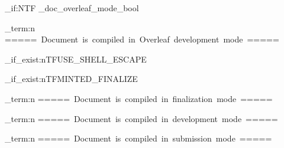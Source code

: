 \ExplSyntaxOn
\bool_if:NTF \g_doc_overleaf_mode_bool
{
    \iow_term:n {=====~Document~is~compiled~in~Overleaf~development~mode~=====}
    \usepackage{minted}
}
{
    \file_if_exist:nTF{USE_SHELL_ESCAPE}
    {
        \file_if_exist:nTF{MINTED_FINALIZE}
        {
            \iow_term:n {=====~Document~is~compiled~in~finalization~mode~=====}
            \usepackage[finalizecache,cachedir={minted-frozen}]{minted}
        }
        {
            \iow_term:n {=====~Document~is~compiled~in~development~mode~=====}
            \usepackage{minted}
        }
    }
    {
        \iow_term:n {=====~Document~is~compiled~in~submission~mode~=====}
        \usepackage[frozencache,cachedir={minted-frozen}]{minted}
    }
}
\ExplSyntaxOff